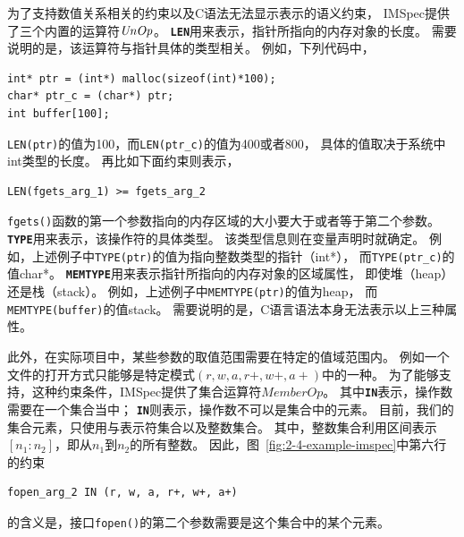 为了支持数值关系相关的约束以及C语法无法显示表示的语义约束，
IMSpec提供了三个内置的运算符$\mathit{UnOp}$。
\textbf{\texttt{LEN}}用来表示，指针所指向的内存对象的长度。
需要说明的是，该运算符与指针具体的类型相关。
例如，下列代码中，
\begin{lstlisting}[language={[ANSI]C},
basicstyle=\linespread{0.8}\listingsfont,
numbers=none,
xleftmargin=.3\textwidth]
int* ptr = (int*) malloc(sizeof(int)*100);
char* ptr_c = (char*) ptr;
int buffer[100];
\end{lstlisting}
\texttt{LEN(ptr)}的值为100，而\texttt{LEN(ptr\_c)}的值为400或者800，
具体的值取决于系统中int类型的长度。
再比如下面约束则表示，
\begin{lstlisting}[language={[ANSI]C},
basicstyle=\linespread{0.8}\listingsfont,
numbers=none,
xleftmargin=.3\textwidth]
LEN(fgets_arg_1) >= fgets_arg_2
\end{lstlisting}
\texttt{fgets()}函数的第一个参数指向的内存区域的大小要大于或者等于第二个参数。
\textbf{\texttt{TYPE}}用来表示，该操作符的具体类型。
该类型信息则在变量声明时就确定。
例如，上述例子中\texttt{TYPE(ptr)}的值为指向整数类型的指针（int*），
而\texttt{TYPE(ptr\_c)}的值char*。
\textbf{\texttt{MEMTYPE}}用来表示指针所指向的内存对象的区域属性，
即使堆（heap）还是栈（stack）。
例如，上述例子中\texttt{MEMTYPE(ptr)}的值为heap，
而\texttt{MEMTYPE(buffer)}的值stack。
需要说明的是，C语言语法本身无法表示以上三种属性。

此外，在实际项目中，某些参数的取值范围需要在特定的值域范围内。
例如一个文件的打开方式只能够是特定模式$(r, w, a, r+, w+, a+)$中的一种。
为了能够支持，这种约束条件，IMSpec提供了集合运算符$\mathit{MemberOp}$。
其中\texttt{\textbf{IN}}表示，操作数需要在一个集合当中；
\texttt{\textbf{IN}}则表示，操作数不可以是集合中的元素。
目前，我们的集合元素，只使用与表示符集合以及整数集合。
其中，整数集合利用区间表示$[n_1:n_2]$，即从$n_1$到$n_2$的所有整数。
因此，图~\ref{fig:2-4-example-imspec}中第六行的约束
\begin{lstlisting}[language={[ANSI]C},
basicstyle=\linespread{0.8}\listingsfont,
numbers=none,
xleftmargin=.3\textwidth]
fopen_arg_2 IN (r, w, a, r+, w+, a+)
\end{lstlisting}
的含义是，接口\texttt{fopen()}的第二个参数需要是这个集合中的某个元素。


